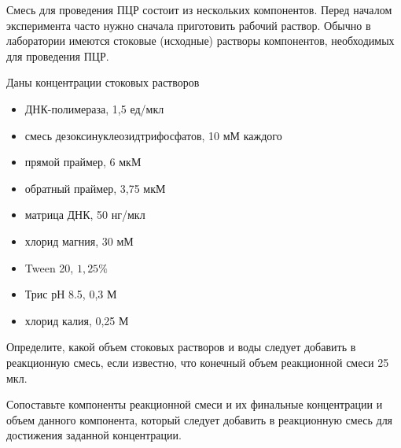
Смесь для проведения ПЦР состоит из нескольких компонентов. Перед началом эксперимента часто нужно сначала приготовить рабочий раствор. Обычно в лаборатории имеются стоковые (исходные) растворы компонентов, необходимых для проведения ПЦР.

Даны концентрации стоковых растворов

\begin{itemize}
    \item ДНК-полимераза, 1,5 ед/мкл
    \item смесь дезоксинуклеозидтрифосфатов, 10 мМ каждого
    \item прямой праймер, 6 мкМ
    \item обратный праймер, 3,75 мкМ
    \item матрица ДНК, 50 нг/мкл
    \item хлорид магния, 30 мМ
    \item Tween 20, $1,25\%$
    \item Трис рН 8.5, 0,3 М
    \item хлорид калия, 0,25 М
\end{itemize}

Определите, какой объем стоковых растворов и воды следует добавить в реакционную смесь, если известно, что конечный объем реакционной смеси 25 мкл.

Сопоставьте компоненты реакционной смеси и их финальные концентрации и объем данного компонента, который следует добавить в реакционную смесь для достижения заданной концентрации.


